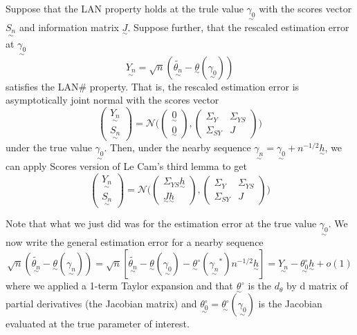 \documentclass[twoside]{article}
\newcommand{\utilde}{\underset{\sim}}
\begin{document}
Suppose that the LAN property holds at the trule value $\utilde{\gamma_0}$ with the scores vector $\utilde{S_n}$ and information matrix $\utilde{J}.$ Suppose further, that the rescaled estimation error at $\utilde{\gamma_0}$
$$
\utilde{Y_n} = \sqrt{n}(\tilde{\utilde{\theta_n}} - \utilde{\theta}(\utilde{\gamma_0}))
$$
satisfies the LAN\# property. That is, the rescaled estimation error is asymptotically joint normal with the scores vector 
$$
\begin{pmatrix}
\utilde{Y_n} \\
\utilde{S_n}
\end{pmatrix}
= 
\mathcal{N}
\bigg( 
\begin{pmatrix}
\utilde{0}\\
\utilde{0}
\end{pmatrix}
,
\begin{pmatrix}
\Sigma_Y & \Sigma_{Y S}\\
\Sigma_{S Y} & J
\end{pmatrix}
\bigg)
$$
under the true value $\utilde{\gamma_0}$. Then, under the nearby sequence $\utilde{\gamma_n} = \utilde{\gamma_0} + n^{-1/2}\utilde{h}$, we can apply Scores version of Le Cam's third lemma to get 
$$
\begin{pmatrix}
\utilde{Y_n} \\
\utilde{S_n}
\end{pmatrix}
= 
\mathcal{N}
\bigg( 
\begin{pmatrix}
\Sigma_{Y S} \utilde{h}\\
\utilde{J}\utilde{h}
\end{pmatrix}
,
\begin{pmatrix}
\Sigma_Y & \Sigma_{Y S}\\
\Sigma_{S Y} & J
\end{pmatrix}
\bigg)
$$

Note that what we just did was for the estimation error at the true value $\utilde{\gamma_0}.$ We now write the general estimation error for a nearby sequence 
$$
\sqrt{n}(\tilde{\utilde{\theta_n}} - \utilde{\theta}(\utilde{\gamma_n})) = \sqrt{n}[\tilde{\utilde{\theta_n}} - \utilde{\theta}(\utilde{\gamma_0}) - \utilde{\theta}^{\circ}(\utilde{\gamma_n}^{*})n^{-1/2}\utilde{h}] = \utilde{Y_n} - \utilde{\theta_0^{\circ}}\utilde{h} + o(1)
$$
where we applied a 1-term Taylor expansion and that $\utilde{\theta}^{\circ}$ is the $d_{\theta}$ by d matrix of partial derivatives (the Jacobian matrix) and $\utilde{\theta_0^{\circ}} = \utilde{\theta^{\circ}}(\utilde{\gamma_0})$ is the Jacobian evaluated at the true parameter of interest.
\end{document}
